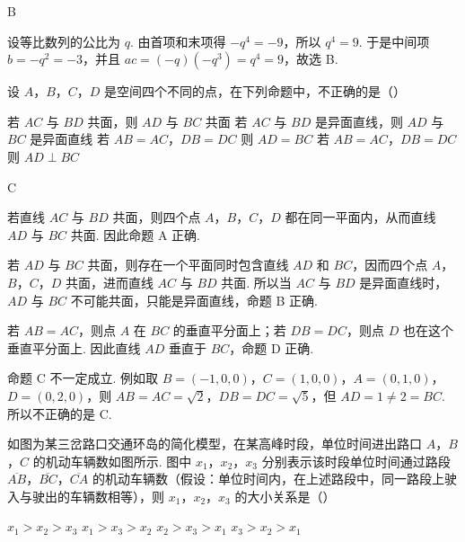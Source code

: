 \begin{answer}
B
\end{answer}

\begin{solution}
设等比数列的公比为 \(q\). 由首项和末项得 \(-q^4=-9\)，所以 \(q^4=9\). 于是中间项 \(b=-q^2=-3\)，并且 \(ac=(-q)(-q^3)=q^4=9\)，故选 B.
\end{solution}

\begin{problem}
设 \(A\)，\(B\)，\(C\)，\(D\) 是空间四个不同的点，在下列命题中，不正确的是（\quad）

\choices
    {若 \(AC\) 与 \(BD\) 共面，则 \(AD\) 与 \(BC\) 共面}
    {若 \(AC\) 与 \(BD\) 是异面直线，则 \(AD\) 与 \(BC\) 是异面直线}
    {若 \(AB = AC\)，\(DB = DC\) 则 \(AD = BC\)}
    {若 \(AB = AC\)，\(DB = DC\) 则 \(AD \perp BC\)}
\end{problem}

\begin{answer}
C
\end{answer}

\begin{solution}
若直线 \(AC\) 与 \(BD\) 共面，则四个点 \(A\)，\(B\)，\(C\)，\(D\) 都在同一平面内，从而直线 \(AD\) 与 \(BC\) 共面. 因此命题 A 正确.

若 \(AD\) 与 \(BC\) 共面，则存在一个平面同时包含直线 \(AD\) 和 \(BC\)，因而四个点 \(A\)，\(B\)，\(C\)，\(D\) 共面，进而直线 \(AC\) 与 \(BD\) 共面. 所以当 \(AC\) 与 \(BD\) 是异面直线时，\(AD\) 与 \(BC\) 不可能共面，只能是异面直线，命题 B 正确.

若 \(AB=AC\)，则点 \(A\) 在 \(BC\) 的垂直平分面上；若 \(DB=DC\)，则点 \(D\) 也在这个垂直平分面上. 因此直线 \(AD\) 垂直于 \(BC\)，命题 D 正确.

命题 C 不一定成立. 例如取 \(B=(-1,0,0)\)，\(C=(1,0,0)\)，\(A=(0,1,0)\)，\(D=(0,2,0)\)，则 \(AB=AC=\sqrt{2}\)，\(DB=DC=\sqrt{5}\)，但 \(AD=1\ne2=BC\). 所以不正确的是 C.
\end{solution}

\begin{problem}
如图为某三岔路口交通环岛的简化模型，在某高峰时段，单位时间进出路口 \(A\)，\(B\)，\(C\) 的机动车辆数如图所示. 图中 \(x_{1}\)，\(x_{2}\)，\(x_{3}\) 分别表示该时段单位时间通过路段 \(\overline{AB}\)，\(\overline{BC}\)，\(\overline{CA}\) 的机动车辆数（假设：单位时间内，在上述路段中，同一路段上驶入与驶出的车辆数相等），则 \(x_{1}\)，\(x_{2}\)，\(x_{3}\) 的大小关系是（\quad）


\choices
    {\(x_{1} > x_{2} > x_{3}\)}
    {\(x_{1} > x_{3} > x_{2}\)}
    {\(x_{2} > x_{3} > x_{1}\)}
    {\(x_{3} > x_{2} > x_{1}\)}
\end{problem}

